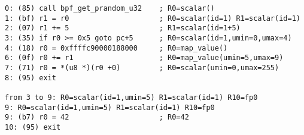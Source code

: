\documentclass{beamer}
\begin{document}
\begin{frame}
    \begin{verbatim}
0: (85) call bpf_get_prandom_u32    ; R0=scalar()
1: (bf) r1 = r0                     ; R0=scalar(id=1) R1=scalar(id=1)
2: (07) r1 += 5                     ; R1=scalar(id=1+5)
3: (35) if r0 >= 0x5 goto pc+5      ; R0=scalar(id=1,umin=0,umax=4)
4: (18) r0 = 0xffffc90000188000     ; R0=map_value()
6: (0f) r0 += r1                    ; R0=map_value(umin=5,umax=9)
7: (71) r0 = *(u8 *)(r0 +0)         ; R0=scalar(umin=0,umax=255)
8: (95) exit

from 3 to 9: R0=scalar(id=1,umin=5) R1=scalar(id=1) R10=fp0
9: R0=scalar(id=1,umin=5) R1=scalar(id=1) R10=fp0
9: (b7) r0 = 42                     ; R0=42
10: (95) exit      
    \end{verbatim}

    

\end{frame}
\end{document}
